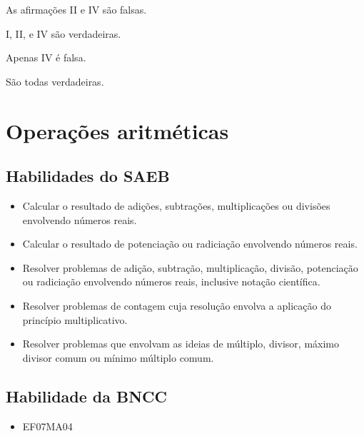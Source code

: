 \begin{escolha}
\item
  As afirmações II e IV são falsas.
\item
  I, II, e IV são verdadeiras.
\item
  Apenas IV é falsa.
\item
  São todas verdadeiras.
\end{escolha}



\chapter{Operações
aritméticas}

\section{Habilidades do SAEB }

\begin{itemize}
\item Calcular o resultado de adições, subtrações,
multiplicações ou divisões envolvendo números reais.
\item
  Calcular o resultado de potenciação ou radiciação envolvendo números
  reais.
\item
  Resolver problemas de adição, subtração, multiplicação, divisão,
  potenciação ou radiciação envolvendo números reais, inclusive notação
  científica.
\item
  Resolver problemas de contagem cuja resolução envolva a aplicação do
  princípio multiplicativo.
\item
  Resolver problemas que envolvam as ideias de múltiplo, divisor, máximo
  divisor comum ou mínimo múltiplo comum.
\end{itemize}

\section{Habilidade da BNCC }
\begin{itemize}
\item EF07MA04
\end{itemize}


